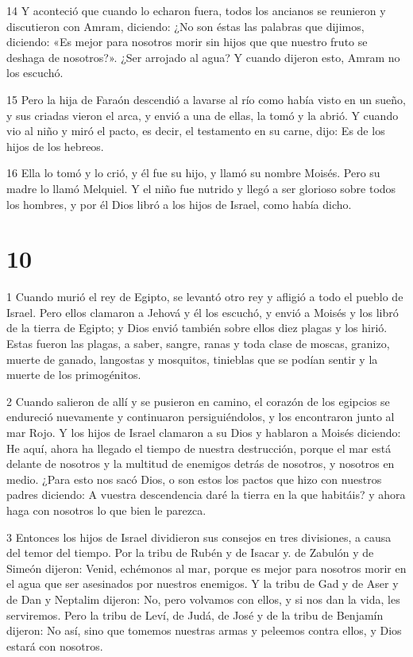 \par 14 Y aconteció que cuando lo echaron fuera, todos los ancianos se reunieron y discutieron con Amram, diciendo: ¿No son éstas las palabras que dijimos, diciendo: «Es mejor para nosotros morir sin hijos que que nuestro fruto se deshaga de nosotros?». ¿Ser arrojado al agua? Y cuando dijeron esto, Amram no los escuchó.

\par 15 Pero la hija de Faraón descendió a lavarse al río como había visto en un sueño, y sus criadas vieron el arca, y envió a una de ellas, la tomó y la abrió. Y cuando vio al niño y miró el pacto, es decir, el testamento en su carne, dijo: Es de los hijos de los hebreos.

\par 16 Ella lo tomó y lo crió, y él fue su hijo, y llamó su nombre Moisés. Pero su madre lo llamó Melquiel. Y el niño fue nutrido y llegó a ser glorioso sobre todos los hombres, y por él Dios libró a los hijos de Israel, como había dicho.

\chapter{10}

\par 1 Cuando murió el rey de Egipto, se levantó otro rey y afligió a todo el pueblo de Israel. Pero ellos clamaron a Jehová y él los escuchó, y envió a Moisés y los libró de la tierra de Egipto; y Dios envió también sobre ellos diez plagas y los hirió. Estas fueron las plagas, a saber, sangre, ranas y toda clase de moscas, granizo, muerte de ganado, langostas y mosquitos, tinieblas que se podían sentir y la muerte de los primogénitos.

\par 2 Cuando salieron de allí y se pusieron en camino, el corazón de los egipcios se endureció nuevamente y continuaron persiguiéndolos, y los encontraron junto al mar Rojo. Y los hijos de Israel clamaron a su Dios y hablaron a Moisés diciendo: He aquí, ahora ha llegado el tiempo de nuestra destrucción, porque el mar está delante de nosotros y la multitud de enemigos detrás de nosotros, y nosotros en medio. ¿Para esto nos sacó Dios, o son estos los pactos que hizo con nuestros padres diciendo: A vuestra descendencia daré la tierra en la que habitáis? y ahora haga con nosotros lo que bien le parezca.

\par 3 Entonces los hijos de Israel dividieron sus consejos en tres divisiones, a causa del temor del tiempo. Por la tribu de Rubén y de Isacar y. de Zabulón y de Simeón dijeron: Venid, echémonos al mar, porque es mejor para nosotros morir en el agua que ser asesinados por nuestros enemigos. Y la tribu de Gad y de Aser y de Dan y Neptalim dijeron: No, pero volvamos con ellos, y si nos dan la vida, les serviremos. Pero la tribu de Leví, de Judá, de José y de la tribu de Benjamín dijeron: No así, sino que tomemos nuestras armas y peleemos contra ellos, y Dios estará con nosotros.

